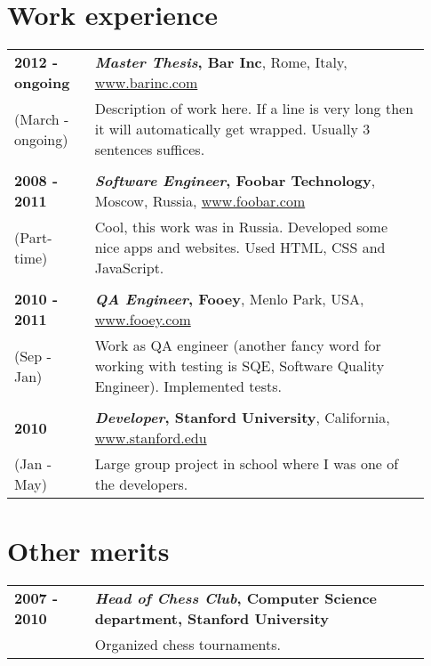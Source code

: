 \documentclass[letterpaper]{article}
\def\rightcolumnwidth{0.75\linewidth}
\def\leftcolumnwidth{0.18\linewidth}
\begin{document}
\section*{Work experience}
\begin{tabular}{p{\leftcolumnwidth} p{\rightcolumnwidth}}
  {\bf 2012 - ongoing} & {\bf \emph{Master Thesis}, Bar Inc},
                         Rome, Italy, \url{www.barinc.com} \\
  (March - ongoing)    & Description of work here. If a line is very long then
                         it will automatically get wrapped. Usually 3 sentences
                         suffices. \\
                       & \\
  {\bf 2008 - 2011}    & {\bf \emph{Software Engineer}, Foobar Technology},
                         Moscow, Russia, \url{www.foobar.com} \\
  (Part-time)          & Cool, this work was in Russia. Developed some nice
                         apps and websites. Used HTML, CSS and JavaScript. \\
                       & \\
  {\bf 2010 - 2011}    & {\bf \emph{QA Engineer}, Fooey}, Menlo Park, USA,
                          \url{www.fooey.com} \\
  (Sep - Jan)          & Work as QA engineer (another fancy word for working
                         with testing is SQE, Software Quality Engineer).
                         Implemented tests. \\
                       & \\
  {\bf 2010}           & {\bf \emph{Developer}, Stanford University},
                          California, \url{www.stanford.edu} \\
  (Jan - May)          & Large group project in school where I was one of
                         the developers.
\end{tabular}

\section*{Other merits}
\begin{tabular}{p{\leftcolumnwidth} p{\rightcolumnwidth}}
    {\bf 2007 - 2010} & {\bf \emph{Head of Chess Club}, Computer Science
                        department, Stanford University} \\
                      & Organized chess tournaments.
\end{tabular}
\end{document}
